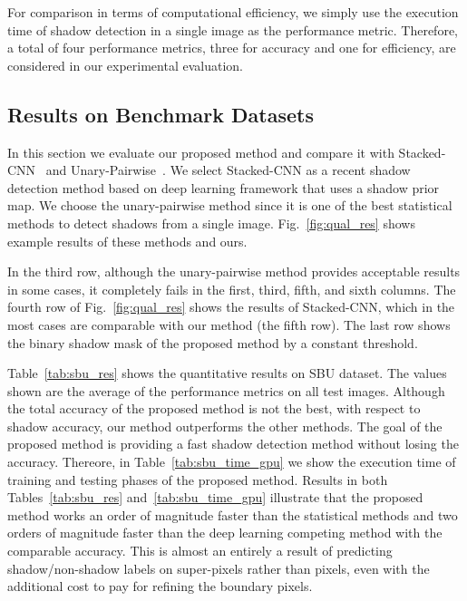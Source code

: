 \documentclass[letterpaper, 10 pt, conference]{ieeeconf}
\begin{document}
For comparison in terms of computational efficiency, we simply use the execution time of shadow detection in a single image as the performance metric. Therefore, a total of four performance metrics, three for accuracy and one for efficiency, are considered in our experimental evaluation.

\subsection{Results on Benchmark Datasets}
In this section we evaluate our proposed method and compare it with Stacked-CNN~\cite{Vicente2} and Unary-Pairwise~\cite{Gue}. We select Stacked-CNN as a recent shadow detection method based on deep learning framework that uses a shadow prior map. We choose the unary-pairwise method since it is one of the best statistical methods to detect shadows from a single image. Fig.~\ref{fig:qual_res} shows example results of these methods and ours. 

In the third row, although the unary-pairwise method provides acceptable results in some cases, it completely fails in the first, third, fifth, and sixth columns. The fourth row of Fig.~\ref{fig:qual_res} shows the results of Stacked-CNN, which in the most cases are comparable with our method (the fifth row). The last row shows the binary shadow mask of the proposed method by a constant threshold. 








Table~\ref{tab:sbu_res} shows the quantitative results on SBU dataset. The values shown are the average of the performance metrics on all test images. Although the total accuracy of the proposed method is not the best, with respect to shadow accuracy, our method outperforms the other methods. The goal of the proposed method is providing a fast shadow detection method without losing the accuracy. Thereore, in Table~\ref{tab:sbu_time_gpu} we show the execution time of training and testing phases of the proposed method. Results in both Tables~\ref{tab:sbu_res} and~\ref{tab:sbu_time_gpu} illustrate that the proposed method works an order of magnitude faster than the statistical methods and two orders of magnitude faster than the deep learning competing method with the comparable accuracy. This is almost an entirely a result of predicting shadow/non-shadow labels on super-pixels rather than pixels, even with the additional cost to pay for refining the boundary pixels.
\end{document}
